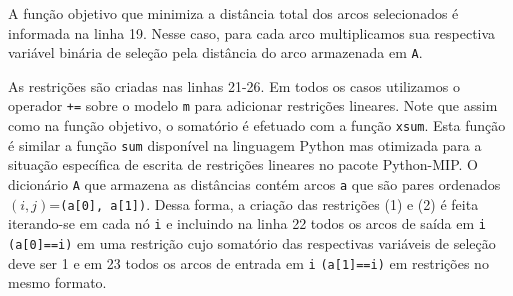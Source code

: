 \documentclass[a4paper,11pt,fleqn]{article}
\begin{document}
A função objetivo que minimiza a distância total dos arcos selecionados é informada na linha 19. Nesse caso, para cada arco multiplicamos sua respectiva variável binária de seleção pela distância do arco armazenada em \texttt{A}.

As restrições são criadas nas linhas 21-26. Em todos os casos utilizamos o operador \texttt{+=} sobre o modelo \texttt{m} para adicionar restrições lineares. Note que assim como na função objetivo, o somatório é efetuado com a função \texttt{xsum}. Esta função é similar a função \texttt{sum} disponível na linguagem Python mas otimizada para a situação específica de escrita de restrições lineares no pacote Python-MIP. O dicionário \texttt{A} que armazena as distâncias contém arcos \texttt{a} que são pares ordenados $(i,j)$=\texttt{(a[0], a[1])}. Dessa forma, a criação das restrições (1) e (2) é feita iterando-se em cada nó \texttt{i} e incluindo na linha 22 todos os arcos de saída em \texttt{i} \texttt{(a[0]==i)} em uma restrição cujo somatório das respectivas variáveis de seleção deve ser 1 e em 23 todos os arcos de entrada em \texttt{i} \texttt{(a[1]==i)} em restrições no mesmo formato.

		


\end{document}
